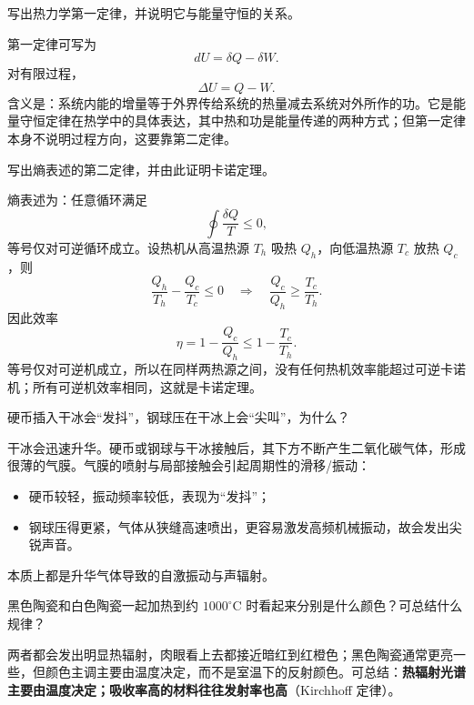 ﻿

\begin{question}
写出热力学第一定律，并说明它与能量守恒的关系。
\begin{solution}
第一定律可写为
\[
dU=\delta Q-\delta W.
\]
对有限过程，
\[
\Delta U=Q-W.
\]
含义是：系统内能的增量等于外界传给系统的热量减去系统对外所作的功。它是能量守恒定律在热学中的具体表达，其中热和功是能量传递的两种方式；但第一定律本身不说明过程方向，这要靠第二定律。
\end{solution}
\end{question}

\begin{question}
写出熵表述的第二定律，并由此证明卡诺定理。
\begin{solution}
熵表述为：任意循环满足
\[
\oint \frac{\delta Q}{T}\le 0,
\]
等号仅对可逆循环成立。设热机从高温热源 $T_h$ 吸热 $Q_h$，向低温热源 $T_c$ 放热 $Q_c$，则
\[
\frac{Q_h}{T_h}-\frac{Q_c}{T_c}\le 0
\quad\Rightarrow\quad
\frac{Q_c}{Q_h}\ge \frac{T_c}{T_h}.
\]
因此效率
\[
\eta=1-\frac{Q_c}{Q_h}\le 1-\frac{T_c}{T_h}.
\]
等号仅对可逆机成立，所以在同样两热源之间，没有任何热机效率能超过可逆卡诺机；所有可逆机效率相同，这就是卡诺定理。
\end{solution}
\end{question}

\begin{question}
硬币插入干冰会“发抖”，钢球压在干冰上会“尖叫”，为什么？
\begin{solution}
干冰会迅速升华。硬币或钢球与干冰接触后，其下方不断产生二氧化碳气体，形成很薄的气膜。气膜的喷射与局部接触会引起周期性的滑移/振动：
\begin{itemize}[leftmargin=1.8em,itemsep=0.2em]
\item 硬币较轻，振动频率较低，表现为“发抖”；
\item 钢球压得更紧，气体从狭缝高速喷出，更容易激发高频机械振动，故会发出尖锐声音。
\end{itemize}
本质上都是升华气体导致的自激振动与声辐射。
\end{solution}
\end{question}

\begin{question}
黑色陶瓷和白色陶瓷一起加热到约 $1000^\circ\mathrm C$ 时看起来分别是什么颜色？可总结什么规律？
\begin{solution}
两者都会发出明显热辐射，肉眼看上去都接近暗红到红橙色；黑色陶瓷通常更亮一些，但颜色主调主要由温度决定，而不是室温下的反射颜色。可总结：\textbf{热辐射光谱主要由温度决定；吸收率高的材料往往发射率也高}（Kirchhoff 定律）。
\end{solution}
\end{question}

